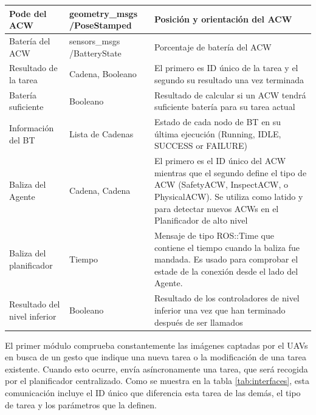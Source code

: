 \documentclass[fontsize=11pt, English=false, Español=true, Myfinal=true, twoside, numbers=noenddot]{scrbook}
\begin{document}
\begin{table}[htb]
\begin{tabular}{|p{}|p{}|p{}|}
      Pode del \gls{ACW} & geometry\_msgs /PoseStamped & Posición y orientación del \gls{ACW}\\ \hline
      
      Batería del \gls{ACW} & sensors\_msgs /BatteryState & Porcentaje de batería del \gls{ACW} \\ \hline

	    Resultado de la tarea & Cadena, Booleano & El primero es \gls{ID} único de la tarea y el segundo su resultado una vez terminada \\ \hline
      
      Batería suficiente & Booleano & Resultado de calcular si un \gls{ACW} tendrá suficiente batería para su tarea actual \\ \hline

	    Información del \gls{BT} & Lista de Cadenas & Estado de cada nodo de \gls{BT} en su última ejecución (Running, IDLE, SUCCESS or FAILURE) \\ \hline
      
      Baliza del Agente & Cadena, Cadena & El primero es el ID único del \gls{ACW} mientras que el segundo define el tipo de \gls{ACW} (SafetyACW, InspectACW, o PhysicalACW). Se utiliza como latido y para detectar nuevos \glspl{ACW} en el Planificador de alto nivel \\ \hline

	    Baliza del planificador & Tiempo & Mensaje de tipo ROS::Time que contiene el tiempo cuando la baliza fue mandada. Es usado para comprobar el estade de la conexión desde el lado del Agente. \\ \hline
      
      Resultado del nivel inferior & Booleano & Resultado de los controladores de nivel inferior una vez que han terminado después de ser llamados \\ \hline
      
    \end{tabular}
\end{table}

El primer módulo comprueba constantemente las imágenes captadas por el \glspl{UAV} en busca de un gesto que indique una nueva tarea o la modificación de una tarea existente. Cuando esto ocurre, envía asíncronamente una tarea, que será recogida por el planificador centralizado. Como se muestra en la tabla \ref{tab:interfaces}, esta comunicación incluye el \gls{ID} único que diferencia esta tarea de las demás, el tipo de tarea y los parámetros que la definen.
\end{document}
